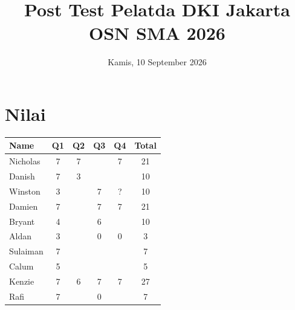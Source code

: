 \documentclass[a4paper, 12pt]{scrartcl}
\title{Post Test Pelatda DKI Jakarta OSN SMA 2026}
\date{Kamis, 10 September 2026}
\author{}
\begin{document}
\maketitle

\renewcommand*\contentsname{Daftar Isi}
\tableofcontents

\newpage

\section{Nilai}

\begin{table}[h!]
	\centering
	\begin{tabular}{|l|c|c|c|c|c|}
		\hline
		\textbf{Name} & \textbf{Q1} & \textbf{Q2} & \textbf{Q3} & \textbf{Q4} & \textbf{Total} \\ \hline
		Nicholas            & 7 & 7 &  & 7 & 21 \\ \hline
		Danish              & 7 & 3 &  &  & 10 \\ \hline
		Winston             & 3 & & 7 & ? & 10 \\ \hline
		Damien              & 7 & & 7 & 7 & 21 \\ \hline
		Bryant              & 4 & & 6 & & 10 \\ \hline
		Aldan               & 3 & & 0 & 0 & 3 \\ \hline
		Sulaiman            & 7 & & & & 7 \\ \hline
		Calum               & 5 & & & & 5 \\ \hline
		Kenzie              & 7 & 6 & 7 & 7 & 27 \\ \hline
		Rafi                & 7 & & 0 & & 7 \\ \hline
	\end{tabular}
\end{table}

\newpage
\end{document}
